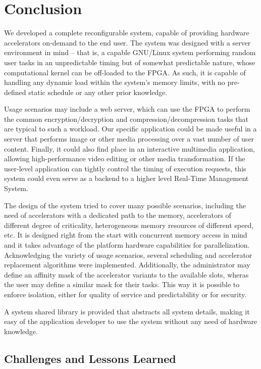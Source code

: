 \chapter{Conclusion}

We developed a complete reconfigurable system, capable of providing hardware accelerators on-demand to the end user.
The system was designed with a server environment in mind -- that is, a capable GNU/Linux system performing
random user tasks in an unpredictable timing but of somewhat predictable nature, whose computational kernel
can be off-loaded to the FPGA. As such, it is capable of handling any dynamic load within the system's memory limits,
with no pre-defined static schedule or any other prior knowledge.

Usage scenarios may include a web server, which can use the FPGA to perform the common encryption/decryption and
compression/decompression tasks that are typical to such a workload. Our specific application could be made useful
in a server that performs image or other media processing over a vast number of user content. Finally, it could
also find place in an interactive multimedia application,
allowing high-performance video editing or other media transformation.
If the user-level application can tightly control the timing of execution requests, this system could even serve
as a backend to a higher level Real-Time Management System.

The design of the system tried to cover many possible scenarios, including the need of accelerators with
a dedicated path to the memory, accelerators of different degree of criticality,
heterogeneous memory resources of different speed, etc.
It is designed right from the start with concurrent memory access in mind and it takes advantage of the
platform hardware capabilities for parallelization. Acknowledging the variety of usage scenarios, several
scheduling and accelerator replacement algorithms were implemented.
Additionally, the administrator may define an affinity mask of the accelerator variants to the available slots,
wheras the user may define a similar mask for their tasks. This way it is possible to enforce isolation,
either for quality of service and predictability or for security.

A system shared library is provided that abstracts all system details, making it easy of the application
developer to use the system without any need of hardware knowledge.

\section{Challenges and Lessons Learned}

